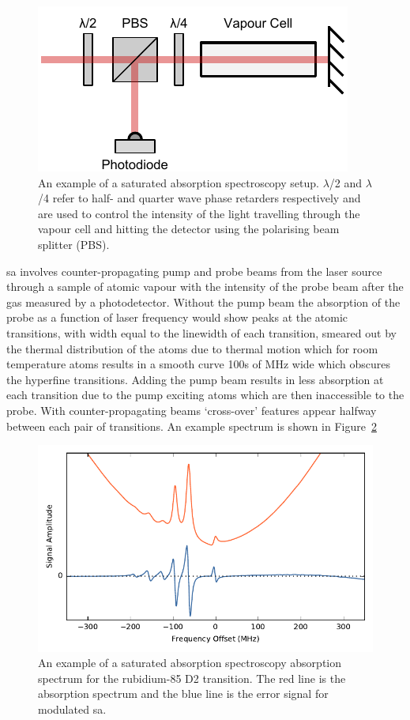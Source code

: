 \begin{figure}
\includegraphics[width=\linewidth]{part1/Figs/SatAbs.pdf}
\caption{An example of a saturated absorption spectroscopy setup. $\lambda$/2 and $\lambda$/4 refer to half- and quarter wave phase retarders respectively and are used to control the intensity of the light travelling through the vapour cell and hitting the detector using the polarising beam splitter (PBS).}
\label{figure:satabs}
\end{figure}

\Gls{sa} involves counter-propagating pump and probe beams from the laser source through a sample of atomic vapour with the intensity of the probe beam after the gas measured by a photodetector.
Without the pump beam the absorption of the probe as a function of laser frequency would show peaks at the atomic transitions, with width equal to the linewidth of each transition, smeared out by the thermal distribution of the atoms due to thermal motion which for room temperature atoms results in a smooth curve 100s of MHz wide which obscures the hyperfine transitions.
Adding the pump beam results in less absorption at each transition due to the pump exciting atoms which are then inaccessible to the probe. With counter-propagating beams `cross-over' features appear halfway between each pair of transitions.
An example spectrum is shown in Figure~\ref{figure:satabsspectrum}

\begin{figure}
\includegraphics[width=\linewidth]{part1/Figs/SatAbsSpectrum.pdf}
\caption{An example of a saturated absorption spectroscopy absorption spectrum for the rubidium-85 D2 transition.
The red line is the absorption spectrum and the blue line is the error signal for modulated \gls{sa}.}
\label{figure:satabsspectrum}
\end{figure}


